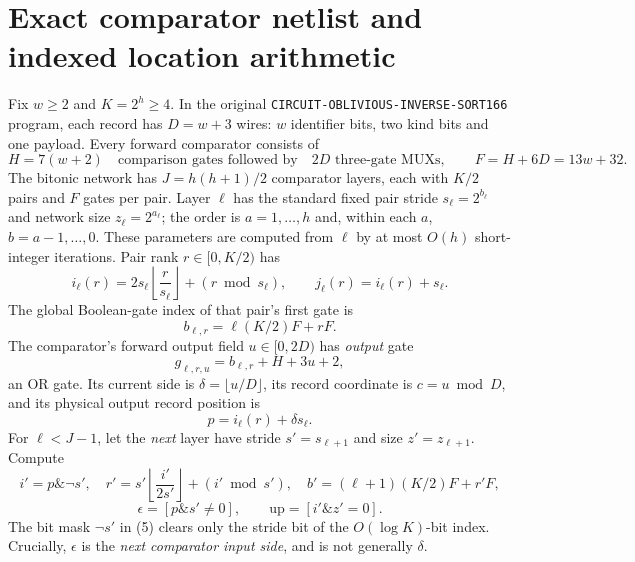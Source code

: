 \documentclass[11pt]{article}
\begin{document}
\section{Exact comparator netlist and indexed location arithmetic}
Fix $w\ge2$ and $K=2^h\ge4$.  In the original
\texttt{CIRCUIT-OBLIVIOUS-INVERSE-SORT166} program, each record has
$D=w+3$ wires: $w$ identifier bits, two kind bits and one payload.
Every forward comparator consists of
\[
 H=7(w+2)\quad\text{comparison gates followed by}\quad
 2D\text{ three-gate MUXs},\qquad
 F=H+6D=13w+32.
\]
The bitonic network has $J=h(h+1)/2$ comparator layers, each
with $K/2$ pairs and $F$ gates per pair.  Layer $\ell$ has the
standard fixed pair stride $s_\ell=2^{b_\ell}$ and network
size $z_\ell=2^{a_\ell}$; the order is
$a=1,\ldots,h$ and, within each $a$, $b=a-1,\ldots,0$.
These parameters are computed from $\ell$ by at most $O(h)$
short-integer iterations.  Pair rank $r\in[0,K/2)$ has
\[
 i_\ell(r)=2s_\ell\left\lfloor\frac{r}{s_\ell}\right\rfloor
              +(r\bmod s_\ell),\qquad
 j_\ell(r)=i_\ell(r)+s_\ell.                              \tag{1}
\]
The global Boolean-gate index of that pair's first gate is
\[
 b_{\ell,r}= \ell(K/2)F+rF.                               \tag{2}
\]
The comparator's forward output field $u\in[0,2D)$ has
\emph{output} gate
\[
 g_{\ell,r,u}=b_{\ell,r}+H+3u+2,                          \tag{3}
\]
an OR gate.  Its current side is
$\delta=\lfloor u/D\rfloor$, its record coordinate is
$c=u\bmod D$, and its physical output record position is
\[
 p=i_\ell(r)+\delta s_\ell.                              \tag{4}
\]
For $\ell<J-1$, let the \emph{next} layer have stride
$s'=s_{\ell+1}$ and size $z'=z_{\ell+1}$.  Compute
\[
 i'=p\mathbin{\&}\neg s',\quad
 r'=s'\left\lfloor\frac{i'}{2s'}\right\rfloor+(i'\bmod s'),
 \quad b'=(\ell+1)(K/2)F+r'F,                           \tag{5}
\]
\[
 \epsilon=[p\mathbin{\&}s'\ne0],
 \qquad \mathrm{up}=[i'\mathbin{\&}z'=0].                 \tag{6}
\]
The bit mask $\neg s'$ in (5) clears only the stride bit of the
$O(\log K)$-bit index. Crucially, $\epsilon$ is the \emph{next
comparator input side}, and is not generally $\delta$.
\end{document}
